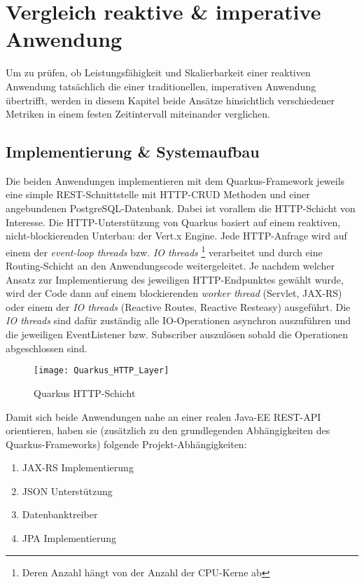 \section {Vergleich reaktive \& imperative Anwendung}
\label{section:vergleich_reaktiv_imperativ}
Um zu prüfen, ob Leistungsfähigkeit und Skalierbarkeit einer reaktiven Anwendung tatsächlich die einer traditionellen, imperativen Anwendung
übertrifft, werden in diesem Kapitel beide Ansätze hinsichtlich verschiedener Metriken in einem festen Zeitintervall miteinander verglichen.

\subsection{Implementierung \& Systemaufbau}
\label{section:implementierung}
Die beiden Anwendungen implementieren mit dem Quarkus-Framework jeweils eine simple REST-Schnittstelle mit HTTP-CRUD Methoden
und einer angebundenen PostgreSQL-Datenbank.
Dabei ist vorallem die HTTP-Schicht von Interesse. Die HTTP-Unterstützung von Quarkus basiert auf einem reaktiven, nicht-blockierenden
Unterbau: der Vert.x Engine.
Jede HTTP-Anfrage wird auf einem der \textit{event-loop threads} bzw. \textit{IO threads}
\footnote{Deren Anzahl hängt von der Anzahl der CPU-Kerne ab}
verarbeitet und durch eine Routing-Schicht an den Anwendungscode weitergeleitet.
Je nachdem welcher Ansatz zur Implementierung des jeweiligen HTTP-Endpunktes gewählt wurde,
wird der Code dann auf einem blockierenden \textit{worker thread} (Servlet, JAX-RS) oder einem der
\textit{IO threads} (Reactive Routes, Reactive Resteasy) ausgeführt.
Die \textit{IO threads} sind dafür zuständig alle IO-Operationen asynchron auszuführen und die jeweiligen EventListener bzw. Subscriber auszulösen sobald
die Operationen abgeschlossen sind.
\newpage
\begin{figure}[h!]
    \centering
    \texttt{[image: Quarkus\_HTTP\_Layer]}
    \caption{Quarkus HTTP-Schicht \parencite{QuarkusReactiveRoutes}}
\end{figure}

Damit sich beide Anwendungen nahe an einer realen Java-EE REST-API orientieren, haben
sie (zusätzlich zu den grundlegenden Abhängigkeiten des Quarkus-Frameworks) folgende Projekt-Abhängigkeiten:
\begin{enumerate}
    \item JAX-RS Implementierung
    \item JSON Unterstützung
    \item Datenbanktreiber
    \item JPA Implementierung
\end{enumerate}

